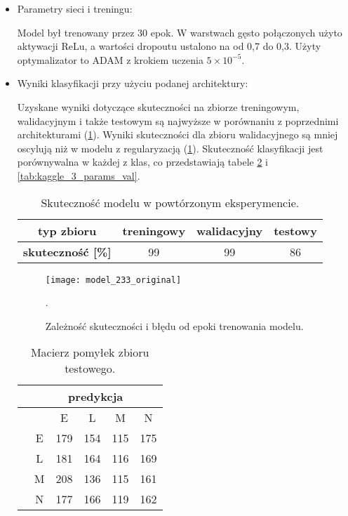{\begin{itemize}
\item Parametry sieci i treningu:

Model był trenowany przez 30 epok. W warstwach gęsto połączonych użyto aktywacji ReLu, a wartości dropoutu ustalono na od 0,7 do 0,3. Użyty optymalizator to ADAM z krokiem uczenia \(5 \times 10^{-5}\). 

\item Wyniki klasyfikacji przy użyciu podanej architektury:

Uzyskane wyniki dotyczące skuteczności na zbiorze treningowym, walidacyjnym i także testowym są najwyższe w porównaniu z poprzednimi architekturami (\ref{tab:kaggle_3_acc_2}). Wyniki skuteczności dla zbioru walidacyjnego są mniej oscylują niż w modelu z regularyzacją (\ref{fig:kaggle_3_acc_trening}). Skuteczność klasyfikacji jest porównywalna w każdej z klas, co przedstawiają tabele \ref{tab:kaggle_3_conf_matrix} i \ref{tab:kaggle_3_params_val}.

\begin{table}[h!]
\centering
\caption[Short Heading]{Skuteczność modelu w powtórzonym eksperymencie.}
\label{tab:kaggle_3_acc_2}
\begin{tabular}{|c|c|c|c|}
\hline
\textbf{typ zbioru}           & \textbf{treningowy} & \textbf{walidacyjny} & \textbf{testowy} \\ \hline
\textbf{skuteczność {[}\%{]}} & 99                  & 99           & 86 \\ \hline
\end{tabular}
\end{table}

\begin{figure}[h!]
	\centering
	\centering
		\texttt{[image: model\_233\_original]}
	\caption{Zależność skuteczności i błędu od epoki trenowania modelu.}.
	\label{fig:kaggle_3_acc_trening}
\end{figure}

\begin{table}[h!]
\centering
\caption[Short Heading]{Macierz pomyłek zbioru testowego.}
\label{tab:kaggle_3_conf_matrix}
\begin{tabular}{|c|c|c|c|c|c|}
\hline
\textbf{}                           & \multicolumn{5}{c|}{\textbf{predykcja}} \\ \hline
{\multirow{5}{*}{\rotatebox[origin=c]{90}{\textbf{klasa}}}} &         & E       & L        & M      & N       \\ \cline{2-6} 
                                    & E       & 179       & 154      & 115      & 175      \\ \cline{2-6} 
                                    & L       & 181       & 164      & 116      & 169      \\ \cline{2-6} 
                                    & M       & 208       & 136      & 115      & 161      \\ \cline{2-6} 
                                    & N       & 177      & 166     & 119      & 162       \\ \hline
\end{tabular}
\end{table}


\end{itemize}}
